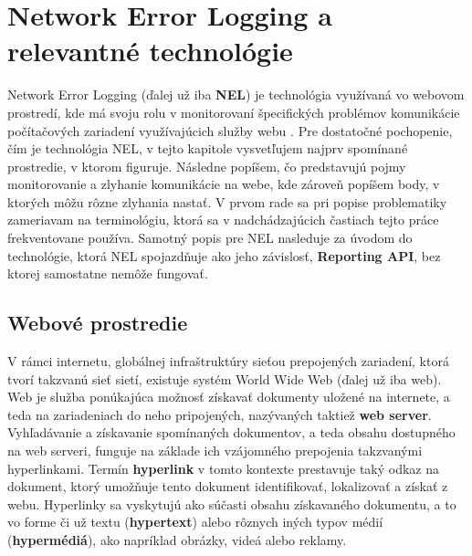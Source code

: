 \chapter{Network Error Logging a relevantné technológie}
\label{nel-and-related-technologies}             


Network Error Logging (ďalej už iba \textbf{NEL}) je technológia využívaná vo webovom prostredí, 
kde má svoju rolu v monitorovaní špecifických problémov komunikácie počítačových zariadení využívajúcich služby webu \cite{W3C-NEL}.
Pre dostatočné pochopenie, čím je technológia NEL, v tejto kapitole vysvetľujem najprv 
spomínané prostredie, v ktorom figuruje. 
Následne popíšem, čo predstavujú pojmy monitorovanie a zlyhanie komunikácie na webe, kde zároveň popíšem body, v ktorých môžu rôzne zlyhania nastať. 
V prvom rade sa pri popise problematiky zameriavam na terminológiu, ktorá sa v nadchádzajúcich častiach tejto práce frekventovane používa. 
Samotný popis pre NEL nasleduje za úvodom do technológie, ktorá NEL spojazdňuje ako jeho závislosť, \textbf{Reporting API}, bez ktorej samostatne nemôže fungovať. %


\section{Webové prostredie}
\label{webove-prostredie}

V rámci internetu, globálnej infraštruktúry sieťou prepojených zariadení, ktorá tvorí takzvanú sieť sietí, existuje systém World Wide Web (ďalej už iba web).
Web je služba ponúkajúca možnosť získavať dokumenty uložené na internete, a teda na zariadeniach do neho pripojených, nazývaných taktiež \textbf{web server}. 
Vyhľadávanie a získavanie spomínaných dokumentov, a teda obsahu dostupného na web serveri, funguje na základe ich vzájomného prepojenia takzvanými hyperlinkami.
Termín \textbf{hyperlink} v tomto kontexte prestavuje taký odkaz na dokument, ktorý umožňuje tento dokument identifikovať, lokalizovať a získať z webu. 
Hyperlinky sa vyskytujú ako súčasti obsahu získavaného dokumentu, a to vo forme či už textu (\textbf{hypertext}) alebo rôznych iných typov médií (\textbf{hypermédiá}), ako napríklad obrázky, videá alebo reklamy. 



